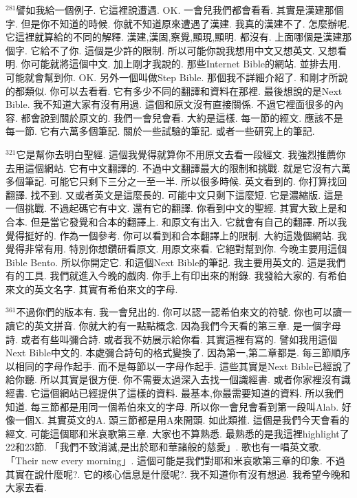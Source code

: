 \documentclass{book}
\begin{document}
$^{281}$譬如我給一個例子.
它這裡說遭遇.
OK.
一會兒我們都會看看.
其實是漢建那個字.
但是你不知道的時候.
你就不知道原來遭遇了漢建.
我真的漢建不了.
怎麼辦呢.
它這裡就算給的不同的解釋.
漢建,漢固,察覺,顯現,顯明.
都沒有.
上面哪個是漢建那個字.
它給不了你.
這個是少許的限制.
所以可能你說我想用中文又想英文.
又想看明.
你可能就將這個中文.
加上剛才我說的.
那些Internet Bible的網站.
並排去用.
可能就會幫到你.
OK.
另外一個叫做Step Bible.
那個我不詳細介紹了.
和剛才所說的都類似.
你可以去看看.
它有多少不同的翻譯和資料在那裡.
最後想說的是Next Bible.
我不知道大家有沒有用過.
這個和原文沒有直接關係.
不過它裡面很多的內容.
都會說到關於原文的.
我們一會兒會看.
大約是這樣.
每一節的經文.
應該不是每一節.
它有六萬多個筆記.
關於一些試驗的筆記.
或者一些研究上的筆記.

$^{321}$它是幫你去明白聖經.
這個我覺得就算你不用原文去看一段經文.
我強烈推薦你去用這個網站.
它有中文翻譯的.
不過中文翻譯最大的限制和挑戰.
就是它沒有六萬多個筆記.
可能它只剩下三分之一至一半.
所以很多時候.
英文看到的.
你打算找回翻譯.
找不到.
又或者英文是這麼長的.
可能中文只剩下這麼短.
它是濃縮版.
這是一個挑戰.
不過起碼它有中文.
還有它的翻譯.
你看到中文的聖經.
其實大致上是和合本.
但是當它發覺和合本的翻譯上.
和原文有出入.
它就會有自己的翻譯.
所以我覺得挺好的.
作為一個參考.
你可以看到和合本翻譯上的限制.
大約這幾個網站.
我覺得非常有用.
特別你想鑽研看原文.
用原文來看.
它絕對幫到你.
今晚主要用這個Bible Bento.
所以你開定它.
和這個Next Bible的筆記.
我主要用英文的.
這是我們有的工具.
我們就進入今晚的戲肉.
你手上有印出來的附錄.
我發給大家的.
有希伯來文的英文名字.
其實有希伯來文的字母.

$^{361}$不過你們的版本有.
我一會兒出的.
你可以認一認希伯來文的符號.
你也可以讀一讀它的英文拼音.
你就大約有一點點概念.
因為我們今天看的第三章.
是一個字母詩.
或者有些叫彌合詩.
或者我不妨展示給你看.
其實這裡有寫的.
譬如我用這個Next Bible中文的.
本處彌合詩句的格式變換了.
因為第一,第二章都是.
每三節順序以相同的字母作起手.
而不是每節以一字母作起手.
這些其實是Next Bible已經說了給你聽.
所以其實是很方便.
你不需要太過深入去找一個識經書.
或者你家裡沒有識經書.
它這個網站已經提供了這樣的資料.
最基本,你最需要知道的資料.
所以我們知道.
每三節都是用同一個希伯來文的字母.
所以你一會兒會看到第一段叫Alab.
好像一個X.
其實英文的A.
頭三節都是用A來開頭.
如此類推.
這個是我們今天會看的經文.
可能這個耶和米哀歌第三章.
大家也不算熟悉.
最熟悉的是我這裡highlight了22和23節.
「我們不致消滅,是出於耶和華諸般的慈愛」.
歌也有一唱英文歌.
「Their new every morning」.
這個可能是我們對耶和米哀歌第三章的印象.
不過其實在說什麼呢?.
它的核心信息是什麼呢?.
我不知道你有沒有想過.
我希望今晚和大家去看.
\end{document}

